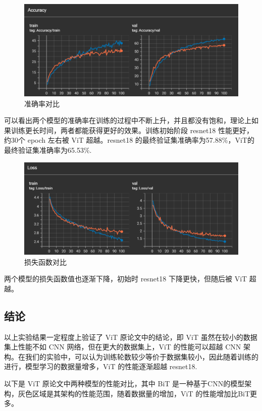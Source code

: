 \documentclass[notitlepage,cs4size,punct,oneside]{ctexrep}
\numberwithin{equation}{chapter}
\theoremstyle{mystyle}
\begin{document}
\begin{figure}[H]
    \centering
    \includegraphics[scale=0.75]{transformer_acc.png}
    \caption{准确率对比}
\end{figure}
可以看出两个模型的准确率在训练的过程中不断上升，并且都没有饱和，理论上如果训练更长时间，两者都能获得更好的效果。训练初始阶段 resnet18 性能更好，约30个 epoch 左右被 ViT 超越。resnet18 的最终验证集准确率为57.88\%，ViT的最终验证集准确率为65.53\%.
\begin{figure}[H]
    \centering
    \includegraphics[scale=0.75]{transformer_loss.png}
    \caption{损失函数对比}
\end{figure}
两个模型的损失函数值也逐渐下降，初始时 resnet18 下降更快，但随后被 ViT 超越。



\subsection{结论}
以上实验结果一定程度上验证了 ViT 原论文中的结论，即 ViT 虽然在较小的数据集上性能不如 CNN 网络，但在更大的数据集上，ViT 的性能可以超越 CNN 架构。在我们的实验中，可以认为训练轮数较少等价于数据集较小，因此随着训练的进行，模型学习的数据量增多，ViT 的性能逐渐超越 resnet18.

以下是 ViT 原论文中两种模型的性能对比，其中 BiT 是一种基于CNN的模型架构，灰色区域是其架构的性能范围，随着数据量的增加，ViT 的性能增加比BiT更多。
\end{document}
